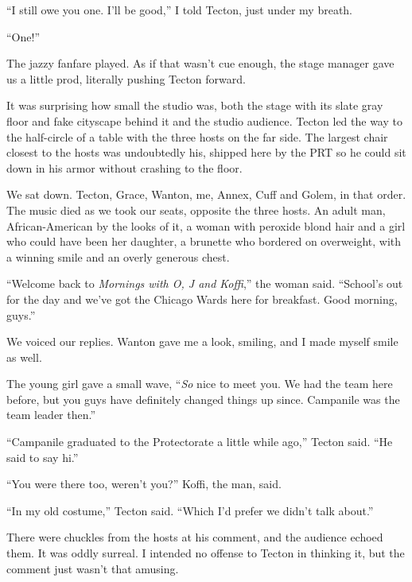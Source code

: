 ``I still owe you one.  I'll be good,'' I told Tecton, just under my breath.



``One!''



The jazzy fanfare played.  As if that wasn't cue enough, the stage manager gave us a little prod, literally pushing Tecton forward.



It was surprising how small the studio was, both the stage with its slate gray floor and fake cityscape behind it and the studio audience.  Tecton led the way to the half-circle of a table with the three hosts on the far side.  The largest chair closest to the hosts was undoubtedly his, shipped here by the PRT so he could sit down in his armor without crashing to the floor.



We sat down.  Tecton, Grace, Wanton, me, Annex, Cuff and Golem, in that order.  The music died as we took our seats, opposite the three hosts.  An adult man, African-American by the looks of it, a woman with peroxide blond hair and a girl who could have been her daughter, a brunette who bordered on overweight, with a winning smile and an overly generous chest.



``Welcome back to \emph{Mornings with O, J and Koffi},'' the woman said.  ``School's out for the day and we've got the Chicago Wards here for breakfast.  Good morning, guys.''



We voiced our replies.  Wanton gave me a look, smiling, and I made myself smile as well.



The young girl gave a small wave, ``\emph{So} nice to meet you.  We had the team here before, but you guys have definitely changed things up since.  Campanile was the team leader then.''



``Campanile graduated to the Protectorate a little while ago,'' Tecton said.  ``He said to say hi.''



``You were there too, weren't you?'' Koffi, the man, said.



``In my old costume,'' Tecton said.  ``Which I'd prefer we didn't talk about.''



There were chuckles from the hosts at his comment, and the audience echoed them.  It was oddly surreal.  I intended no offense to Tecton in thinking it, but the comment just wasn't that amusing.



